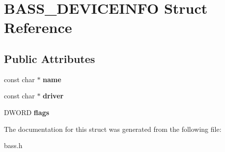 \hypertarget{structBASS__DEVICEINFO}{}\section{B\+A\+S\+S\+\_\+\+D\+E\+V\+I\+C\+E\+I\+N\+F\+O Struct Reference}
\label{structBASS__DEVICEINFO}
\subsection*{Public Attributes}
\begin{DoxyCompactItemize}
\item 
\hypertarget{structBASS__DEVICEINFO_a4f40b670573299964ecd8222076436eb}{}const char $\ast$ {\bfseries name}\label{structBASS__DEVICEINFO_a4f40b670573299964ecd8222076436eb}

\item 
\hypertarget{structBASS__DEVICEINFO_aa4a4e2d3eee9548b7f68440b8508ea11}{}const char $\ast$ {\bfseries driver}\label{structBASS__DEVICEINFO_aa4a4e2d3eee9548b7f68440b8508ea11}

\item 
\hypertarget{structBASS__DEVICEINFO_ae5d2db8d3570744a4b24e41dfa62554b}{}D\+W\+O\+R\+D {\bfseries flags}\label{structBASS__DEVICEINFO_ae5d2db8d3570744a4b24e41dfa62554b}

\end{DoxyCompactItemize}


The documentation for this struct was generated from the following file\+:\begin{DoxyCompactItemize}
\item 
bass.\+h\end{DoxyCompactItemize}
